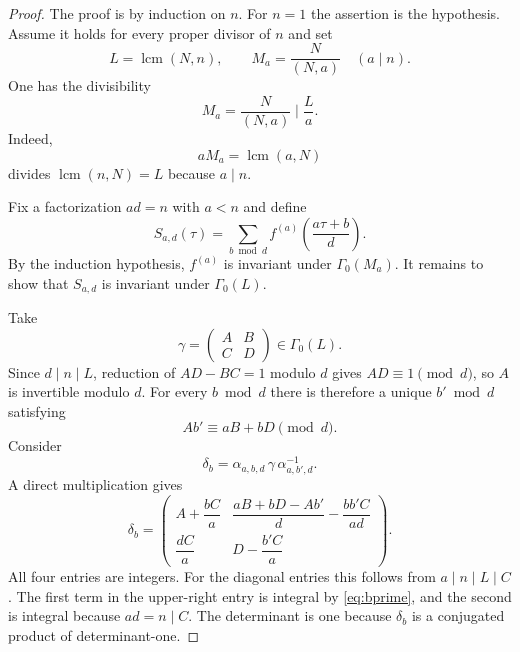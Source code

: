 \documentclass[12pt]{amsart}
\theoremstyle{definition}
\theoremstyle{remark}
\numberwithin{equation}{section}
\newcommand{\C}{\mathbb C}
\begin{document}
\begin{proof}
The proof is by induction on $n$. For $n=1$ the assertion is the hypothesis. Assume it holds for every proper divisor of $n$ and set
\[
L=\operatorname{lcm}(N,n),
\qquad
M_a=\frac{N}{(N,a)}
\quad(a\mid n).
\]
One has the divisibility
\begin{equation}\label{eq:lcm-divisibility}
M_a=\frac{N}{(N,a)}\mid\frac{L}{a}.
\end{equation}
Indeed,
\[
aM_a=\operatorname{lcm}(a,N)
\]
divides $\operatorname{lcm}(n,N)=L$ because $a\mid n$.

Fix a factorization $ad=n$ with $a<n$ and define
\begin{equation}\label{eq:branch-sum}
S_{a,d}(\tau)=
\sum_{b\bmod d}
 f^{(a)}\!\left(\frac{a\tau+b}{d}\right).
\end{equation}
By the induction hypothesis, $f^{(a)}$ is invariant under $\Gamma_0(M_a)$. It remains to show that $S_{a,d}$ is invariant under $\Gamma_0(L)$.

Take
\[
\gamma=\begin{pmatrix}A&B\\C&D\end{pmatrix}\in\Gamma_0(L).
\]
Since $d\mid n\mid L$, reduction of $AD-BC=1$ modulo $d$ gives $AD\equiv1\pmod d$, so $A$ is invertible modulo $d$. For every $b\bmod d$ there is therefore a unique $b'\bmod d$ satisfying
\begin{equation}\label{eq:bprime}
Ab'\equiv aB+bD\pmod d.
\end{equation}
Consider
\[
\delta_{b}=\alpha_{a,b,d}\,\gamma\,\alpha_{a,b',d}^{-1}.
\]
A direct multiplication gives
\begin{equation}\label{eq:delta-matrix}
\delta_b=
\begin{pmatrix}
A+\dfrac{bC}{a}
&
\dfrac{aB+bD-Ab'}{d}-\dfrac{bb'C}{ad}
\\[3mm]
\dfrac{dC}{a}
&
D-\dfrac{b'C}{a}
\end{pmatrix}.
\end{equation}
All four entries are integers. For the diagonal entries this follows from $a\mid n\mid L\mid C$. The first term in the upper-right entry is integral by \eqref{eq:bprime}, and the second is integral because $ad=n\mid C$. The determinant is one because $\delta_b$ is a conjugated product of determinant-one.


\end{proof}
\end{document}
